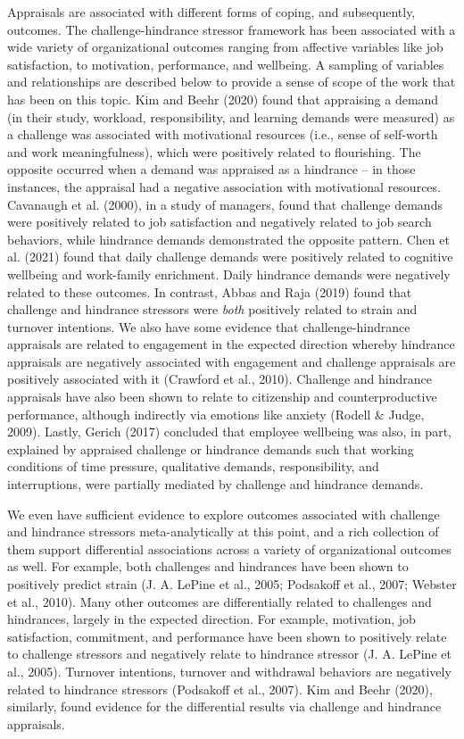 \documentclass[
  english,
  man]{apa6}
\begin{document}
Appraisals are associated with different forms of coping, and subsequently, outcomes. The challenge-hindrance stressor framework has been associated with a wide variety of organizational outcomes ranging from affective variables like job satisfaction, to motivation, performance, and wellbeing. A sampling of variables and relationships are described below to provide a sense of scope of the work that has been on this topic. Kim and Beehr (2020) found that appraising a demand (in their study, workload, responsibility, and learning demands were measured) as a challenge was associated with motivational resources (i.e., sense of self-worth and work meaningfulness), which were positively related to flourishing. The opposite occurred when a demand was appraised as a hindrance -- in those instances, the appraisal had a negative association with motivational resources. Cavanaugh et al. (2000), in a study of managers, found that challenge demands were positively related to job satisfaction and negatively related to job search behaviors, while hindrance demands demonstrated the opposite pattern. Chen et al. (2021) found that daily challenge demands were positively related to cognitive wellbeing and work-family enrichment. Daily hindrance demands were negatively related to these outcomes. In contrast, Abbas and Raja (2019) found that challenge and hindrance stressors were \emph{both} positively related to strain and turnover intentions. We also have some evidence that challenge-hindrance appraisals are related to engagement in the expected direction whereby hindrance appraisals are negatively associated with engagement and challenge appraisals are positively associated with it (Crawford et al., 2010). Challenge and hindrance appraisals have also been shown to relate to citizenship and counterproductive performance, although indirectly via emotions like anxiety (Rodell \& Judge, 2009). Lastly, Gerich (2017) concluded that employee wellbeing was also, in part, explained by appraised challenge or hindrance demands such that working conditions of time pressure, qualitative demands, responsibility, and interruptions, were partially mediated by challenge and hindrance demands.

We even have sufficient evidence to explore outcomes associated with challenge and hindrance stressors meta-analytically at this point, and a rich collection of them support differential associations across a variety of organizational outcomes as well. For example, both challenges and hindrances have been shown to positively predict strain (J. A. LePine et al., 2005; Podsakoff et al., 2007; Webster et al., 2010). Many other outcomes are differentially related to challenges and hindrances, largely in the expected direction. For example, motivation, job satisfaction, commitment, and performance have been shown to positively relate to challenge stressors and negatively relate to hindrance stressor (J. A. LePine et al., 2005). Turnover intentions, turnover and withdrawal behaviors are negatively related to hindrance stressors (Podsakoff et al., 2007). Kim and Beehr (2020), similarly, found evidence for the differential results via challenge and hindrance appraisals.
\end{document}
